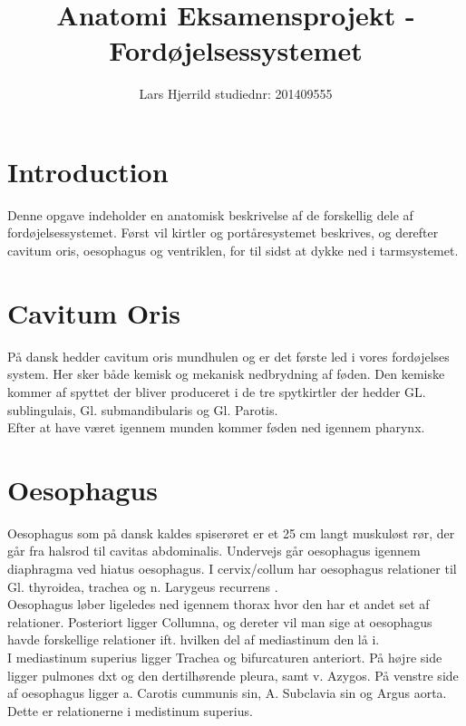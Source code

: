 	
	
	\title{Anatomi Eksamensprojekt - Fordøjelsessystemet}
	\author{Lars Hjerrild studiednr: 201409555}
	
	\maketitle
	\thispagestyle{empty}
	
	\pagebreak
	\section{Introduction}
	Denne opgave indeholder en anatomisk beskrivelse af de forskellig dele af fordøjelsessystemet. Først vil kirtler og portåresystemet beskrives, og derefter cavitum oris, oesophagus og ventriklen, for til sidst at dykke ned i tarmsystemet.\\
	
	
	\section{Cavitum Oris}
	På dansk hedder cavitum oris mundhulen og er det første led i vores fordøjelses system. Her sker både kemisk og mekanisk nedbrydning af føden. Den kemiske kommer af spyttet der bliver produceret i de tre spytkirtler der hedder GL. sublingulais, Gl. submandibularis og Gl. Parotis.\\ 
	
	Efter at have været igennem munden kommer føden ned igennem pharynx.
	
	\section{Oesophagus}
	Oesophagus som på dansk kaldes spiserøret er et 25 cm langt muskuløst rør, der går fra halsrod til cavitas abdominalis. Undervejs går oesophagus igennem diaphragma ved hiatus oesophagus. I cervix/collum har oesophagus relationer til Gl. thyroidea, trachea og n. Larygeus recurrens .\\
	
	Oesophagus løber ligeledes ned igennem thorax hvor den har et andet set af relationer. Posteriort ligger Collumna, og dereter vil man sige at oesophagus havde forskellige relationer ift. hvilken del af mediastinum den lå i.\\
	
	I mediastinum superius ligger Trachea og bifurcaturen anteriort. På højre side ligger pulmones dxt og den dertilhørende pleura, samt v. Azygos. På venstre side af oesophagus ligger a. Carotis cummunis sin, A. Subclavia sin og Argus aorta. Dette er relationerne i medistinum superius.
	
